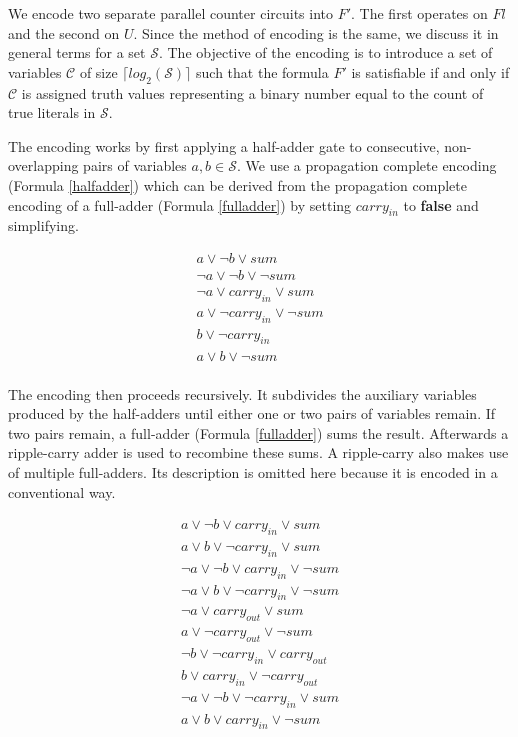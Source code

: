 \documentclass{article}
\begin{document}
We encode two separate parallel counter circuits into $F'$. The first operates
on $Fl$ and the second on $U$. Since the method of encoding is the same, we
discuss it in general terms for a set $\mathscr{S}$. The objective of the
encoding is to introduce a set of variables $\mathscr{C}$ of size $\lceil
log_2(\mathscr{S}) \rceil$ such that the formula $F'$ is satisfiable if and
only if $\mathscr{C}$ is assigned truth values representing a binary number
equal to the count of true literals in $\mathscr{S}$.

The encoding works by first applying a half-adder gate to consecutive,
non-overlapping pairs of variables $a, b \in \mathscr{S}$. We use a propagation
complete encoding (Formula \ref{halfadder}) which can be derived from the
propagation complete encoding of a full-adder (Formula \ref{fulladder}) by
setting $carry_{in}$ to \textbf{false} and simplifying.

\begin{equation}
  \label{halfadder}
  \begin{split}
    a \lor \neg{b} \lor sum \\
    \neg{a} \lor \neg{b} \lor \neg{sum} \\
    \neg{a} \lor carry_{in} \lor sum \\
    a \lor \neg{carry_{in}} \lor \neg{sum} \\
    b \lor \neg{carry_{in}} \\
    a \lor b \lor \neg{sum} \\
  \end{split}
\end{equation}\break

\noindent The encoding then proceeds recursively. It subdivides the auxiliary
variables produced by the half-adders until either one or two pairs of variables
remain. If two pairs remain, a full-adder (Formula \ref{fulladder}) sums the
result. Afterwards a ripple-carry adder is used to recombine these sums. A
ripple-carry also makes use of multiple full-adders. Its description is omitted
here because it is encoded in a conventional way.

\begin{equation}
  \label{fulladder}
  \begin{split}
    a \lor \neg{b} \lor carry_{in} \lor sum \\
    a \lor b \lor \neg{carry_{in}} \lor sum \\
    \neg{a} \lor \neg{b} \lor carry_{in} \lor \neg{sum} \\
    \neg{a} \lor b \lor \neg{carry_{in}} \lor \neg{sum} \\
    \neg{a} \lor carry_{out} \lor sum \\
    a \lor \neg{carry_{out}}\lor \neg{sum} \\
    \neg{b} \lor \neg{carry_{in}} \lor carry_{out} \\
    b \lor carry_{in} \lor \neg{carry_{out}} \\
    \neg{a} \lor \neg{b} \lor \neg{carry_{in}} \lor sum \\
    a \lor b \lor carry_{in} \lor \neg{sum} \\
  \end{split}
\end{equation}\break
\end{document}
